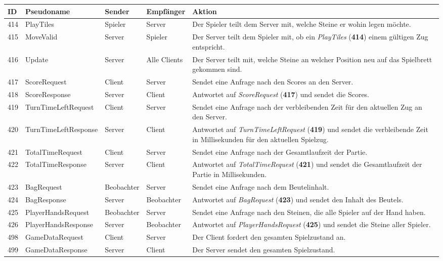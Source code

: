 \documentclass[a4paper, 10pt]{article}
\begin{document}
\newpage
\begin{center}
	\begin{tabular}{| l | l | p{2.5cm} | p{2.5cm} | p{6cm} |}
		\hline
			ID & Pseudoname & Sender & Empfänger & Aktion \\
		\hline \hline
			414 & PlayTiles & Spieler & Server &
			Der Spieler teilt dem Server mit, welche Steine er wohin legen möchte. \\
		\hline
			415 & MoveValid & Server & Spieler &
			Der Server teilt dem Spieler mit, ob ein \textit{PlayTiles} (\textbf{414}) einem gültigen Zug entspricht.\\
		\hline
			416 & Update & Server & Alle Clients &
			Der Server teilt mit, welche Steine an welcher Position neu auf das Spielbrett gekommen sind. \\
		\hline
			417 & ScoreRequest & Client & Server &
			Sendet eine Anfrage nach den Scores an den Server. \\
		\hline
			418 & ScoreResponse & Server & Client &
			Antwortet auf \textit{ScoreRequest} (\textbf{417}) und sendet die Scores. \\
		\hline
			419 & TurnTimeLeftRequest & Client & Server &
			Sendet eine Anfrage nach der verbleibenden Zeit für den aktuellen Zug an den Server. \\
		\hline
			420 & TurnTimeLeftResponse & Server & Client &
			Antwortet auf \textit{TurnTimeLeftRequest} (\textbf{419}) und sendet die verbleibende Zeit in Millisekunden für den aktuellen Spielzug. \\
		\hline
			421 & TotalTimeRequest & Client & Server &
			Sendet eine Anfrage nach der Gesamtlaufzeit der Partie. \\
		\hline
			422 & TotalTimeResponse & Server & Client &
			Antwortet auf \textit{TotalTimeRequest} (\textbf{421}) und sendet die Gesamtlaufzeit der Partie in Millisekunden. \\
		\hline
			423 & BagRequest & Beobachter & Server &
			Sendet eine Anfrage nach dem Beutelinhalt. \\
		\hline
			424 & BagResponse & Server & Beobachter &
			Antwortet auf \textit{BagRequest} (\textbf{423}) und sendet den Inhalt des Beutels. \\
		\hline
			425 & PlayerHandsRequest & Beobachter & Server &
			Sendet eine Anfrage nach den Steinen, die alle Spieler auf der Hand haben. \\
		\hline
			426 & PlayerHandsResponse & Server & Beobachter &
			Antwortet auf \textit{PlayerHandsRequest} (\textbf{425}) und sendet die Steine aller Spieler. \\
		\hline
			498 & GameDataRequest & Client & Server &
			Der Client fordert den gesamten Spielzustand an. \\
		\hline
			499 & GameDataResponse & Server & Client &
			Der Server sendet den gesamten Spielzustand. \\
		\hline
	\end{tabular}
\end{center}
\end{document}
